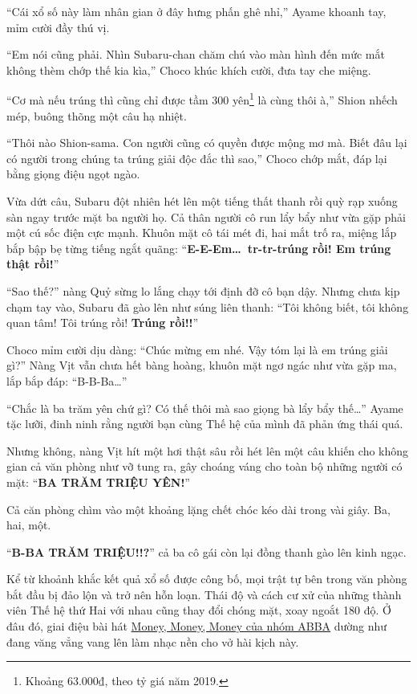 \documentclass[../main.tex]{subfiles}
\begin{document}
``Cái xổ số này làm nhân gian ở đây hưng phấn ghê nhỉ,'' Ayame khoanh tay, mỉm cười đầy thú vị.

``Em nói cũng phải. Nhìn Subaru-chan chăm chú vào màn hình đến mức mắt không thèm chớp thế kia kìa,'' Choco khúc khích cười, đưa tay che miệng.

``Cơ mà nếu trúng thì cũng chỉ được tầm 300 yên\footnote{Khoảng 63.000₫, theo tỷ giá năm 2019.} là cùng thôi à,'' Shion nhếch mép, buông thõng một câu hạ nhiệt.

``Thôi nào Shion-sama. Con người cũng có quyền được mộng mơ mà. Biết đâu lại có người trong chúng ta trúng giải độc đắc thì sao,'' Choco chớp mắt, đáp lại bằng giọng điệu ngọt ngào.

Vừa dứt câu, Subaru đột nhiên hét lên một tiếng thất thanh rồi quỳ rạp xuống sàn ngay trước mặt ba người họ. Cả thân người cô run lẩy bẩy như vừa gặp phải một cú sốc điện cực mạnh. Khuôn mặt cô tái mét đi, hai mắt trố ra, miệng lắp bắp bập bẹ từng tiếng ngắt quãng: ``\textbf{E-E-Em\dots\ tr-tr-trúng rồi! Em trúng thật rồi!}''


``Sao thế?'' nàng Quỷ sừng lo lắng chạy tới định đỡ cô bạn dậy. Nhưng chưa kịp chạm tay vào, Subaru đã gào lên như súng liên thanh: ``Tôi không biết, tôi không quan tâm! Tôi trúng rồi! \textbf{Trúng rồi!!}''

Choco mỉm cười dịu dàng: ``Chúc mừng em nhé. Vậy tóm lại là em trúng giải gì?'' Nàng Vịt vẫn chưa hết bàng hoàng, khuôn mặt ngơ ngác như vừa gặp ma, lắp bắp đáp: ``B-B-Ba\dots''

``Chắc là ba trăm yên chứ gì? Có thế thôi mà sao giọng bà lẩy bẩy thế\dots'' Ayame tặc lưỡi, đinh ninh rằng người bạn cùng Thế hệ của mình đã phản ứng thái quá.

Nhưng không, nàng Vịt hít một hơi thật sâu rồi hét lên một câu khiến cho không gian cả văn phòng như vỡ tung ra, gây choáng váng cho toàn bộ những người có mặt: ``\textbf{BA TRĂM TRIỆU YÊN!}''

Cả căn phòng chìm vào một khoảng lặng chết chóc kéo dài trong vài giây. Ba, hai, một.

``\textbf{B-BA TRĂM TRIỆU!!?}'' cả ba cô gái còn lại đồng thanh gào lên kinh ngạc.

\ct

Kể từ khoảnh khắc kết quả xổ số được công bố, mọi trật tự bên trong văn phòng bắt đầu bị đảo lộn và trở nên hỗn loạn. Thái độ và cách cư xử của những thành viên Thế hệ thứ Hai với nhau cũng thay đổi chóng mặt, xoay ngoắt 180 độ. Ở đâu đó, giai điệu bài hát \href{https://www.youtube.com/watch?v=ETxmCCsMoD0}{Money, Money, Money của nhóm ABBA} dường như đang văng vẳng vang lên làm nhạc nền cho vở hài kịch này.
\end{document}
